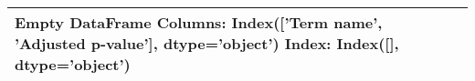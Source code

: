 \begin{tabular}{ll}
\toprule
Empty DataFrame
Columns: Index(['Term name', 'Adjusted p-value'], dtype='object')
Index: Index([], dtype='object') \\
\bottomrule
\end{tabular}
